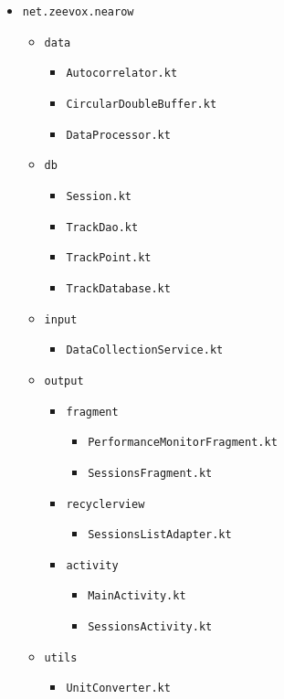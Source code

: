 \documentclass[11pt,twoside,a4paper]{report}
\begin{document}
\begin{itemize}
  \item \texttt{net.zeevox.nearow}
  \begin{itemize}
    \item \texttt{data}
      \begin{itemize}
      \item \texttt{Autocorrelator.kt}
      \item \texttt{CircularDoubleBuffer.kt}
      \item \texttt{DataProcessor.kt}
    \end{itemize}
    \item \texttt{db}
    \begin{itemize}
      \item \texttt{Session.kt}
      \item \texttt{TrackDao.kt}
      \item \texttt{TrackPoint.kt}
      \item \texttt{TrackDatabase.kt}
    \end{itemize}
    \item \texttt{input}
    \begin{itemize}
      \item \texttt{DataCollectionService.kt}
    \end{itemize}
    \item \texttt{output}
    \begin{itemize}
      \item \texttt{fragment}
      \begin{itemize}
        \item \texttt{PerformanceMonitorFragment.kt}
        \item \texttt{SessionsFragment.kt}
      \end{itemize}
      \item \texttt{recyclerview}
      \begin{itemize}
        \item \texttt{SessionsListAdapter.kt}
      \end{itemize}
      \item \texttt{activity}
      \begin{itemize}
        \item \texttt{MainActivity.kt}
        \item \texttt{SessionsActivity.kt}
      \end{itemize}
    \end{itemize}
    \item \texttt{utils}
    \begin{itemize}
      \item \texttt{UnitConverter.kt}
    \end{itemize}
  \end{itemize}
\end{itemize}
\end{document}
